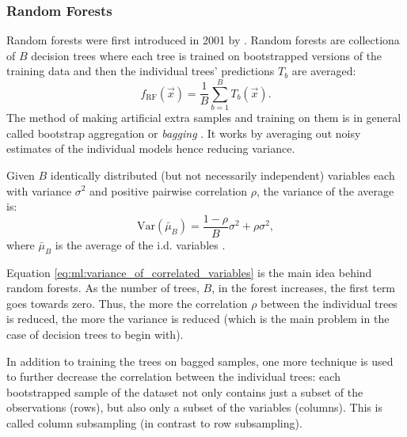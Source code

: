 \subsubsection{Random Forests}
\label{subsubsec:ml:random_forest}
Random forests were first introduced in 2001 by \citet{breimanRandomForests2001}. Random forests are collectiona of $B$ decision trees where each tree is trained on bootstrapped versions of the training data and then the individual trees' predictions $T_b$ are averaged: 
\begin{equation}
  f_\mathrm{RF}(\vec{x}) = \frac{1}{B}  \sum_{b=1}^B T_b(\vec{x}).
\end{equation}
The method of making artificial extra samples and training on them is in general called bootstrap aggregation or \emph{bagging} \autocite{hastieElementsStatisticalLearning2009}. It works by averaging out noisy estimates of the individual models hence reducing variance. 
\begin{theorem}
  Given $B$ identically distributed (but not necessarily independent) variables each with variance $\sigma^2$ and positive pairwise correlation $\rho$, the variance of the average is:
  \begin{equation}
    \label{eq:ml:variance_of_correlated_variables}
    \mathrm{Var}(\bar{\mu}_B) = \frac{1-\rho}{B} \sigma^2 + \rho \sigma^2,
  \end{equation}
  where $\bar{\mu}_B$ is the average of the i.d. variables \autocite{hastieElementsStatisticalLearning2009}. %
\end{theorem}
Equation \eqref{eq:ml:variance_of_correlated_variables} is the main idea behind random forests. As the number of trees, $B$, in the forest increases, the first term goes towards zero. Thus, the more the correlation $\rho$ between the individual trees is reduced, the more the variance is reduced (which is the main problem in the case of decision trees to begin with). 

In addition to training the trees on bagged samples, one more technique is used to further decrease the correlation between the individual trees: each bootstrapped sample of the dataset not only contains just a subset of the observations (rows), but also only a subset of the variables (columns). This is called column subsampling (in contrast to row subsampling).

